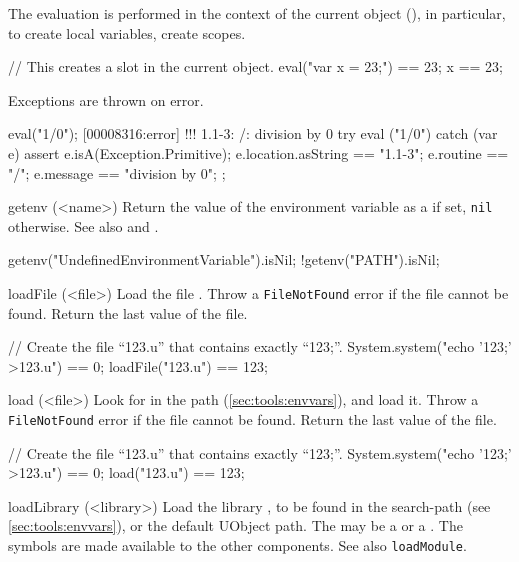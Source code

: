 \begin{urbiscriptapi}
  The evaluation is performed in the context of the current object
  (\this), in particular, to create local variables, create
  scopes.
\begin{urbiassert}
// This creates a slot in the current object.
eval("var x = 23;") == 23;
x == 23;
\end{urbiassert}

  Exceptions are thrown on error.
\begin{urbiscript}
eval("1/0");
[00008316:error] !!! 1.1-3: /: division by 0
try
{
  eval ("1/0")
}
catch (var e)
{
  assert
  {
    e.isA(Exception.Primitive);
    e.location.asString  == "1.1-3";
    e.routine            == "/";
    e.message            == "division by 0";
  }
};
\end{urbiscript}

\item[getenv](<name>)%
  Return the value of the environment variable  as a
   if set, \lstinline|nil| otherwise.  See also
   and .
\begin{urbiassert}
getenv("UndefinedEnvironmentVariable").isNil;
!getenv("PATH").isNil;
\end{urbiassert}

\item[loadFile](<file>)%
  Load the \us file .  Throw a \lstinline|FileNotFound|
  error if the file cannot be found.  Return the last value of the
  file.
\begin{urbiassert}
// Create the file ``123.u'' that contains exactly ``123;''.
System.system("echo '123;' >123.u") == 0;
loadFile("123.u") == 123;
\end{urbiassert}

\item[load](<file>)%
  Look for  in the \urbi path (\autoref{sec:tools:envvars}),
  and load it.  Throw a \lstinline|FileNotFound| error if the file
  cannot be found.  Return the last value of the file.
\begin{urbiassert}
// Create the file ``123.u'' that contains exactly ``123;''.
System.system("echo '123;' >123.u") == 0;
load("123.u") == 123;
\end{urbiassert}

\item[loadLibrary](<library>)%
  Load the library , to be found in the
   search-path (see
  \autoref{sec:tools:envvars}), or the default UObject path.
  The  may be a  or a .
  The \Cxx symbols are made available to the other \Cxx components.  See also
  \lstinline|loadModule|.


\end{urbiscriptapi}
